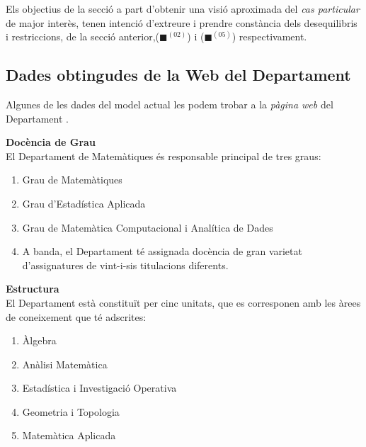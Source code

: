 \documentclass[10pt]{proc}
\begin{document}
Els objectius de la secció a  part d'obtenir una visió aproximada del \textit{cas particular} de major interès, tenen intenció d'extreure i prendre constància dels desequilibris i restriccions, de la secció anterior,({\color{blue!60}$\blacksquare$}$^{(02)}$) i ({\color{violet!60}$\blacksquare$}$^{(05)}$)  respectivament. 
\\

\subsection{Dades obtingudes de la Web del Departament}
Algunes de les dades del model actual les podem trobar a la \textit{pàgina web} del Departament \cite{webdep}.

\vspace{3mm}

\begin{tcolorbox}[colback=black!1,title=\textbf{Dades publiques a la web},coltitle=black,colbacktitle=black!10]
\textbf{Docència de Grau}\\
El Departament de Matemàtiques és responsable principal de tres graus:
	\begin{enumerate}
		\item Grau de Matemàtiques
		\item Grau d'Estadística Aplicada
		\item Grau de Matemàtica Computacional i Analítica de Dades
		\item A banda, el Departament té assignada docència de gran varietat d'assignatures de vint-i-sis titulacions diferents.
	\end{enumerate}
	\textbf{Estructura}\\
	El Departament està constituït per cinc unitats, que es corresponen amb les àrees de coneixement que té adscrites:
	\begin{enumerate}
		\item Àlgebra
		\item Anàlisi Matemàtica
		\item Estadística i Investigació Operativa
		\item Geometria i Topologia
		\item Matemàtica Aplicada
	\end{enumerate}
\end{tcolorbox}
\end{document}
